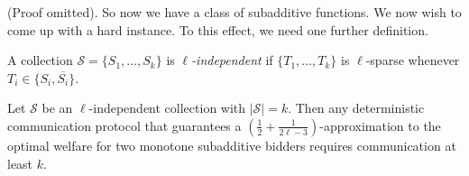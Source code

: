 (Proof omitted). So now we have a class of subadditive functions. We now wish to come up with a hard instance. To this effect, we need one further definition.

\begin{definition}
	A collection $\mathcal{S} = \{S_1,\ldots, S_k\}$ is \emph{$\ell$-independent} if $\{T_1,\ldots, T_k\}$ is $\ell$-sparse whenever $T_i \in \{S_i, \overline{S_i}\}$. 
\end{definition}

\begin{proposition}\label{prop:lindependent}Let $\mathcal{S}$ be an $\ell$-independent collection with $|\mathcal{S}| = k$. Then any deterministic communication protocol that guarantees a $(\frac{1}{2} + \frac{1}{2\ell-3})$-approximation to the optimal welfare for two monotone subadditive bidders requires communication at least $k$. 
\end{proposition}

